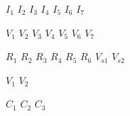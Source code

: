 \documentclass[11pt]{article}
\begin{document}
$I_1$
$I_2$
$I_3$
$I_4$
$I_5$
$I_6$
$I_7$

	

$V_1$
$V_2$
$V_3$
$V_4$
$V_5$
$V_6$
$V_7$

$R_1$	
$R_2$
$R_3$
$R_4$
$R_5$
$R_6$
$V_{s1}$
$V_{s2}$

$V_{1}$
$V_{2}$

$C_1$
$C_2$
$C_3$
\end{document}
